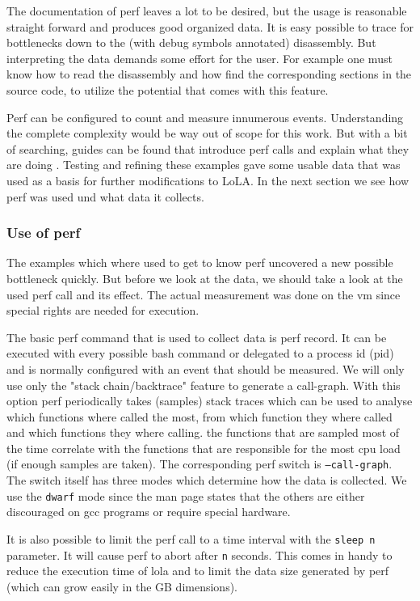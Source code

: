The documentation of perf leaves a lot to be desired, but the usage is reasonable straight forward and produces good organized data. It is easy possible to trace for bottlenecks down to the (with debug symbols annotated) disassembly. But interpreting the data demands some effort for the user. For example one must know how to read the disassembly and how find the corresponding sections in the source code, to utilize the potential that comes with this feature.

Perf can be configured to count and measure innumerous events. Understanding the complete complexity would be way out of scope for this work. But with a bit of searching, guides can be found that introduce perf calls and explain what they are doing \cite{perfExamples}. Testing and refining these examples gave some usable data that was used as a basis for further modifications to LoLA. In the next section we see how perf was used und what data it collects.

\subsubsection{Use of perf}
The examples which where used to get to know perf uncovered a new possible bottleneck quickly. But before we look at the data, we should take a look at the used perf call and its effect. The actual measurement was done on the vm since special rights are needed for execution.

The basic perf command that is used to collect data is perf record. It can be executed with every possible bash command or delegated to a process id (pid) and is normally configured with an event that should be measured. We will only use only the "stack chain/backtrace" feature to generate a call-graph. With this option perf periodically takes (samples) stack traces which can be used to analyse which functions where called the most, from which function they where called and which functions they where calling. the functions that are sampled most of the time correlate with the functions that are responsible for the most cpu load (if enough samples are taken). The corresponding perf switch is \texttt{--call-graph}. The switch itself has three modes which determine how the data is collected. We use the \texttt{dwarf} mode since the man page states that the others are either discouraged on gcc programs or require special hardware.

It is also possible to limit the perf call to a time interval with the \texttt{sleep n} parameter. It will cause perf to abort after \texttt{n} seconds. This comes in handy to reduce the execution time of lola and to limit the data size generated by perf (which can grow easily in the GB dimensions).

